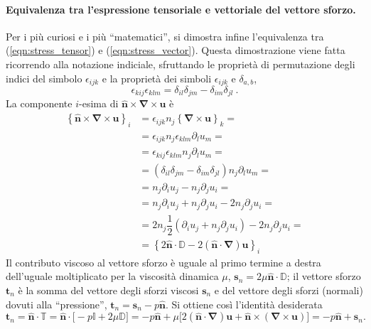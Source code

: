 \paragraph{Equivalenza tra l'espressione tensoriale e vettoriale del vettore sforzo.}
Per i più curiosi e i più ``matematici'', si dimostra infine l'equivalenza tra (\ref{eqn:stress_tensor}) e (\ref{eqn:stress_vector}). Questa dimostrazione viene fatta  ricorrendo alla notazione indiciale, sfruttando le proprietà di permutazione degli indici del simbolo $\epsilon_{ijk}$ e la proprietà dei simboli $\epsilon_{ijk}$ e $\delta_{a,b}$,
\begin{equation}
 \epsilon_{kij}\epsilon_{klm} = \delta_{il}\delta_{jm} - \delta_{im}\delta_{jl} \ .
\end{equation}
 La componente $i$-esima di $\bm{\hat{n}} \times \bm{\nabla} \times \bm{u}$ è
\begin{equation}
\begin{aligned}
 \left\{ \bm{\hat{n}} \times \bm{\nabla} \times \bm{u} \right\}_i & =
 \epsilon_{ijk} n_j \left\{ \bm{\nabla} \times \bm{u} \right\}_k = \\
  & = \epsilon_{ijk} n_j \epsilon_{klm} \partial_l u_m = \\
  & = \epsilon_{kij} \epsilon_{klm} n_j \partial_l u_m = \\
  & = (\delta_{il}\delta_{jm} - \delta_{im}\delta_{jl} ) n_j \partial_l u_m = \\
  & = n_j \partial_i u_j - n_j \partial_j u_i = \\
  & = n_j \partial_i u_j + n_j \partial_j u_i - 2 n_j \partial_j u_i = \\
  & = 2 n_j \dfrac{1}{2}\left(\partial_i u_j + n_j \partial_j u_i \right) - 2 n_j \partial_j u_i = \\
  & = \left\{2 \bm{\hat{n}} \cdot \mathbb{D} - 2 ( \bm{\hat{n}} \cdot \bm{\nabla} ) \bm{u} \right\}_i
\end{aligned}
\end{equation}
Il contributo viscoso al vettore sforzo è uguale al primo termine a destra 
 dell'uguale moltiplicato per la viscosità dinamica $\mu$, $\bm{s}_n = 
 2 \mu \bm{\hat{n}} \cdot \mathbb{D}$; il vettore sforzo $\bm{t}_n$ è la
 somma del vettore degli sforzi viscosi $\bm{s}_n$ e del vettore degli
 sforzi (normali) dovuti alla ``pressione'', $\bm{t}_n = \bm{s}_n 
 - p \bm{\hat{n}}$. Si ottiene così l'identità desiderata
 \begin{equation}\label{eqn:stress_tensor-3}
 \bm{t}_n = \bm{\hat{n}} \cdot \mathbb{T} =
  \bm{\hat{n}} \cdot \big[-p\mathbb{I} + 2\mu\mathbb{D} \big] = 
  -p \bm{\hat{n}} +
 \mu \big[2 (\bm{\hat{n}} \cdot \bm{\nabla}) \bm{u} +
  \bm{\hat{n}} \times (\bm{\nabla} \times \bm{u}) \big] = 
  - p\bm{\hat{n}} + \bm{s}_n.
\end{equation}

